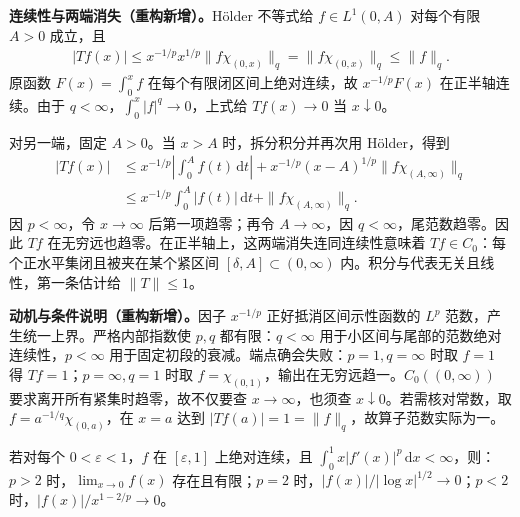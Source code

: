 \documentclass[../../main.tex]{subfiles}
\begin{document}
\begin{solution}
\textbf{连续性与两端消失（重构新增）。}Hölder 不等式给 $f\in L^1(0,A)$ 对每个有限 $A>0$ 成立，且
\begin{align*}
|Tf(x)|\leqslant x^{-1/p}x^{1/p}\|f\chi_{(0,x)}\|_q
=\|f\chi_{(0,x)}\|_q\leqslant\|f\|_q.
\end{align*}
原函数 $F(x)=\int_0^x f$ 在每个有限闭区间上绝对连续，故 $x^{-1/p}F(x)$ 在正半轴连续。由于 $q<\infty$，$\int_0^x|f|^q\to0$，上式给 $Tf(x)\to0$ 当 $x\downarrow0$。

对另一端，固定 $A>0$。当 $x>A$ 时，拆分积分并再次用 Hölder，得到
\begin{align*}
|Tf(x)|
&\leqslant x^{-1/p}\left|\int_0^A f(t)\,\mathrm dt\right|
+x^{-1/p}(x-A)^{1/p}\|f\chi_{(A,\infty)}\|_q\\
&\leqslant x^{-1/p}\int_0^A|f(t)|\,\mathrm dt+\|f\chi_{(A,\infty)}\|_q.
\end{align*}
因 $p<\infty$，令 $x\to\infty$ 后第一项趋零；再令 $A\to\infty$，因 $q<\infty$，尾范数趋零。因此 $Tf$ 在无穷远也趋零。在正半轴上，这两端消失连同连续性意味着 $Tf\in C_0$：每个正水平集闭且被夹在某个紧区间 $[\delta,A]\subset(0,\infty)$ 内。积分与代表无关且线性，第一条估计给 $\|T\|\leqslant1$。
\end{solution}
\begin{remark}
\textbf{动机与条件说明（重构新增）。}因子 $x^{-1/p}$ 正好抵消区间示性函数的 $L^p$ 范数，产生统一上界。严格内部指数使 $p,q$ 都有限：$q<\infty$ 用于小区间与尾部的范数绝对连续性，$p<\infty$ 用于固定初段的衰减。端点确会失败：$p=1,q=\infty$ 时取 $f=1$ 得 $Tf=1$；$p=\infty,q=1$ 时取 $f=\chi_{(0,1)}$，输出在无穷远趋一。$C_0((0,\infty))$ 要求离开所有紧集时趋零，故不仅要查 $x\to\infty$，也须查 $x\downarrow0$。若需核对常数，取 $f=a^{-1/q}\chi_{(0,a)}$，在 $x=a$ 达到 $|Tf(a)|=1=\|f\|_q$，故算子范数实际为一。
\end{remark}
\begin{exercise}\label{exercise:ch06-weighted-derivative-boundary}
若对每个 $0<\varepsilon<1$，$f$ 在 $[\varepsilon,1]$ 上绝对连续，且 $\int_0^1x|f'(x)|^p\,\mathrm dx<\infty$，则：$p>2$ 时，$\lim_{x\to0}f(x)$ 存在且有限；$p=2$ 时，$|f(x)|/|\log x|^{1/2}\to0$；$p<2$ 时，$|f(x)|/x^{1-2/p}\to0$。
\end{exercise}
\end{document}
